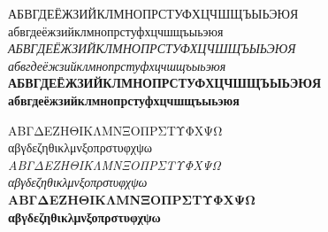\documentclass[10pt]{lecturenotes}
\begin{document}
\begin{sloppypar}
\begin{figure}[ht]
\begin{minipage}[b]{0.45\linewidth}
\noindent
\textsf{%
АБВГДЕЁЖЗИЙКЛМНОПРСТУФХЦЧШЩЪЫЬЭЮЯ \\
абвгдеёжзийклмнопрстуфхцчшщъыьэюя \\
\textit{АБВГДЕЁЖЗИЙКЛМНОПРСТУФХЦЧШЩЪЫЬЭЮЯ\\
абвгдеёжзийклмнопрстуфхцчшщъыьэюя }\\
\textbf{АБВГДЕЁЖЗИЙКЛМНОПРСТУФХЦЧШЩЪЫЬЭЮЯ \\
абвгдеёжзийклмнопрстуфхцчшщъыьэюя }\\
}

\noindent
\textsf{%
ΑΒΓΔΕΖΗΘΙΚΛΜΝΞΟΠΡΣΤΥΦΧΨΩ\\
αβγδεζηθικλμνξοπρστυφχψω\\
\textit{ΑΒΓΔΕΖΗΘΙΚΛΜΝΞΟΠΡΣΤΥΦΧΨΩ\\
αβγδεζηθικλμνξοπρστυφχψω}\\
\textbf{ΑΒΓΔΕΖΗΘΙΚΛΜΝΞΟΠΡΣΤΥΦΧΨΩ\\
αβγδεζηθικλμνξοπρστυφχψω}\\
}


\end{minipage}
\end{figure}

\pagebreak


\end{sloppypar}
\end{document}
